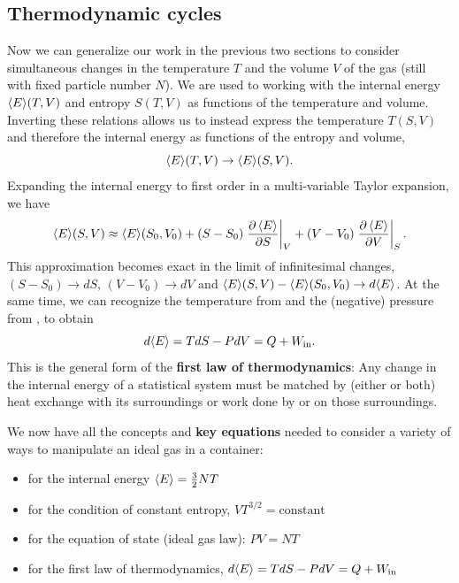 \subsection{Thermodynamic cycles}
Now we can generalize our work in the previous two sections to consider simultaneous changes in the temperature $T$ and the volume $V$ of the gas (still with fixed particle number $N$).
We are used to working with the internal energy $\left\langle E \right\rangle\!(T, V)$ and entropy $S(T, V)$ as functions of the temperature and volume.
Inverting these relations allows us to instead express the temperature $T(S, V)$ and therefore the internal energy as functions of the entropy and volume,
\begin{equation*}
  \left\langle E \right\rangle\!(T, V) \to \left\langle E \right\rangle\!(S, V).
\end{equation*}
Expanding the internal energy to first order in a multi-variable Taylor expansion, we have
\begin{equation*}
  \left\langle E \right\rangle\!(S, V) \approx \left\langle E \right\rangle\!(S_0, V_0) + (S - S_0) \left.\frac{\partial \left\langle E \right\rangle}{\partial S}\right|_V + (V - V_0) \left.\frac{\partial \left\langle E \right\rangle}{\partial V}\right|_S.
\end{equation*}
This approximation becomes exact in the limit of infinitesimal changes, $(S - S_0) \to dS$, $(V - V_0) \to dV$ and $\left\langle E \right\rangle\!(S, V) - \left\langle E \right\rangle\!(S_0, V_0) \to d\!\left\langle E \right\rangle$.
At the same time, we can recognize the temperature from  and the (negative) pressure from , to obtain
\begin{equation}
  \label{eq:first_law}
  d\!\left\langle E \right\rangle = T dS - P dV = Q + W_{\text{in}}.
\end{equation}
This is the general form of the \textbf{first law of thermodynamics}: Any change in the internal energy of a statistical system must be matched by (either or both) heat exchange with its surroundings or work done by or on those surroundings.

\begin{shaded}
  We now have all the concepts and \textbf{key equations} needed to consider a variety of ways to manipulate an ideal gas in a container: \\[-24 pt]
  \begin{itemize}
    \item {} for the internal energy $\left\langle E \right\rangle = \frac{3}{2} NT$
    \item {} for the condition of constant entropy, $V T^{3/2} = \mbox{constant}$
    \item {} for the equation of state (ideal gas law): $PV = NT$
    \item {} for the first law of thermodynamics, $d\!\left\langle E \right\rangle = T dS - P dV = Q + W_{\text{in}}$
  \end{itemize}
\end{shaded}

